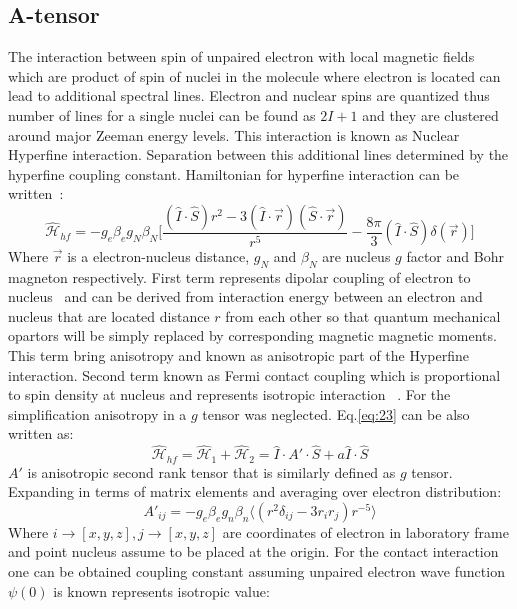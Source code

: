 \subsection{A-tensor}\label{atensorsection}
The interaction between spin of unpaired electron with local magnetic fields which are product of spin of nuclei in the molecule where electron is located can lead to additional spectral lines. Electron and nuclear spins are quantized thus number of lines for a single nuclei can be found as $2I+1$ and they are clustered around major Zeeman energy levels. This interaction is known as Nuclear Hyperfine interaction. Separation between this additional lines determined by the hyperfine coupling constant. Hamiltonian for hyperfine interaction can be written~\cite{nordio}: 
\begin{equation}\label{eq:23}
\mathcal{\hat{H}}_{hf}=-g_e\beta_eg_N\beta_N\Big[\frac{(\hat{I}\cdot \hat{S})r^2-3(\hat{I}\cdot\vec{r})(\hat{S}\cdot\vec{r})}{r^5}-\frac{8\pi}{3}(\hat{I}\cdot\hat{S})\delta(\vec{r})\Big]
\end{equation} 
Where $\vec{r}$ is a electron-nucleus distance, $g_N$ and $\beta_N$ are nucleus $g$ factor and Bohr magneton respectively. First term represents dipolar coupling of electron to nucleus~\cite{car} and can be derived from interaction energy between an electron and nucleus that are located distance $r$ from each other so that quantum mechanical opartors will be simply replaced by corresponding magnetic magnetic moments. This term bring anisotropy and known as anisotropic part of the Hyperfine interaction. Second term known as Fermi contact coupling which is proportional to spin density at nucleus and represents isotropic interaction ~\cite{slich}. For the simplification anisotropy in a $g$ tensor was neglected. Eq.\ref{eq:23} can be also written as: 
\begin{equation}\label{eq:24}
\mathcal{\hat{H}}_{hf}= \mathcal{\hat{H}}_1+\mathcal{\hat{H}}_2=\hat{I}\cdot A'\cdot\hat{S}+a\hat{I}\cdot\hat{S}
\end{equation} 
$A'$ is anisotropic second rank tensor that is similarly defined as $g$ tensor. Expanding in terms of matrix elements and averaging over electron distribution:
\begin{equation}\label{eq:25}
A'_{ij}= -g_e\beta_eg_n\beta_n\langle(r^2\delta_{ij}-3r_ir_j)r^{-5}\rangle
\end{equation} 
Where $i\rightarrow[x,y,z],j\rightarrow[x,y,z]$ are coordinates of electron in laboratory frame and point nucleus assume to be placed at the origin. For the contact interaction one can be obtained coupling constant assuming unpaired electron wave function $\psi(0)$ is known represents isotropic value:
